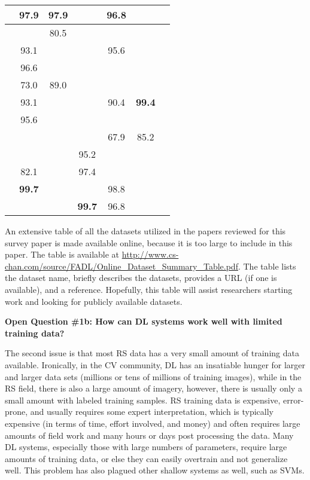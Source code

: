 \documentclass[12pt]{spieman}
\newcommand{\ParSection}[1]{}
\begin{document}
\begin{spacing}{1}
\begin{table}[ht]
\begin{tabular}{|c|c|c|c|c|c|c|}
\cite{Pan2017RVCANet} & 97.9 & 97.9 &  & 96.8 &  &  \\ \hline
\cite{Rajan2008Active} &  & 80.5 &  &  &  &  \\ \hline
\cite{ran2016bands} & 93.1 &  &  & 95.6 &  &  \\ \hline
\cite{slavkovikj2015hyperspectral} & 96.6 &  &  &  &  &  \\ \hline
\cite{Sun2016Active} & 73.0 & 89.0 &  &  &  &  \\ \hline
\cite{Wang2015Semisupervised} & 93.1 &  &  & 90.4 & \textbf{99.4} &  \\ \hline
\cite{Yang2016Two} & 95.6 &  &  &  &  &  \\ \hline
\cite{yue2016deep} &  &  &  & 67.9 & 85.2 &  \\ \hline
\cite{yue2015spectral} &  &  & 95.2 &  &  &  \\ \hline
\cite{Zabalza2016Novel} & 82.1 &  & 97.4 &  &  &  \\ \hline
\cite{zhang2017spectral} & \textbf{99.7} &  &  & 98.8 &  &  \\ \hline
\cite{Zhao2016Learning} &  &  & \textbf{99.7} & 96.8 &  & \\ \hline                                                      
\end{tabular}
\end{table}

An extensive table of all the datasets utilized in the papers reviewed for this survey paper is made available online, because it is too large to include in this paper. The table is available at \url{http://www.cs-chan.com/source/FADL/Online_Dataset_Summary_Table.pdf}. The table lists the dataset name, briefly describes the datasets, provides a URL (if one is available), and a reference. Hopefully, this table will assist researchers starting work and looking for publicly available datasets.

\textbf{Open Question \#1b: How can DL systems work well with limited training data?}

\ParSection{Small training available}
The second issue is that most RS data has a very small amount of training data available. Ironically, in the CV community, DL has an insatiable hunger for larger and larger data sets (millions or tens of millions of training images), while in the RS field, there is also a large amount of imagery, however, there is usually only a small amount with labeled training samples. RS training data is expensive, error-prone, and usually requires some expert interpretation, which is typically expensive (in terms of time, effort involved, and money) and often requires large amounts of field work and many hours or days post processing the data. Many DL systems, especially those with large numbers of parameters, require large amounts of training data, or else they can easily overtrain and not generalize well. This problem has also plagued other shallow systems as well, such as SVMs.


\end{spacing}
\end{document}
